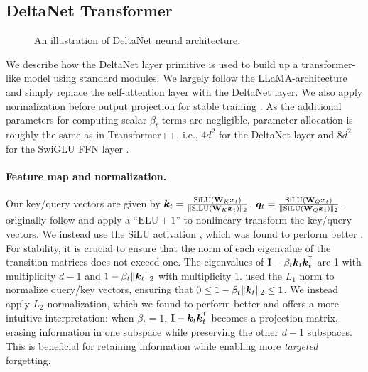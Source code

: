 \subsection{DeltaNet Transformer}
\begin{figure}
   \centering
   \vspace{-15mm}
   \resizebox{\linewidth}{!}{}
   \vspace{-8mm}
   \caption{An illustration of DeltaNet neural architecture.}
   \label{fig:enter-label}
   \vspace{-10mm}
\end{figure}

We describe how the DeltaNet layer primitive is used to build up a transformer-like model using standard modules. We largely  follow the LLaMA-architecture  \cite[Transformer++,][]{touvron2023llama} and simply replace the self-attention layer with the DeltaNet layer. We also apply normalization before output projection for stable training \cite{qin_devil_2022, Mercat2024LinearizingLL}. As the additional parameters for computing scalar $\beta_t$ terms are negligible,  parameter allocation is roughly the same as in Transformer++, i.e., $4d^2$ for the DeltaNet layer  and $8d^2$ for the SwiGLU FFN layer \cite{shazeer2020glu}. 
\vspace{-2mm}
\paragraph{Feature map and normalization.} 
Our key/query vectors are given by ${\bm{k}}_t = \frac{\text{SiLU}({\mathbf{W}}_{K}{\bm{x}}_t)}{\Vert \text{SiLU}({\mathbf{W}}_{K}{\bm{x}}_t)\Vert_2}$, ${\bm{q}}_t = \frac{\text{SiLU}({\mathbf{W}}_{Q}{\bm{x}}_t)}{\Vert \text{SiLU}({\mathbf{W}}_{Q}{\bm{x}}_t)\Vert_2}$.  \citet{schlag_linear_2021} originally follow \citet{katharopoulos_transformers_2020} and apply a ``$\text{ELU}+1$'' \cite{clevert_fast_2016} to nonlineary transform the key/query vectors. We instead use the $\text{SiLU}$ activation \cite{elfwing_sigmoid-weighted_2017}, which was found to perform better \cite{qin2023scaling, mamba2}.
For stability, it is crucial to ensure that the norm of each eigenvalue of the transition matrices does not exceed one.  The eigenvalues of $\rmI - \beta_t \vk_t \vk_t^\intercal$ are 1 with multiplicity \(d-1\) and \(1 - \beta_t \|{\bm{k}}_t\|_2\) with multiplicity 1. \citet{schlag_linear_2021} used the $L_1$ norm to normalize query/key vectors, ensuring that $
0 \leq 1 - \beta_t \| {\bm{k}}_t\|_2 \leq 1$. We instead apply $L_2$ normalization, which we found to perform better and offers a more intuitive interpretation: when $\beta_t=1$, $\rmI-\vk_t \vk_t^\intercal$ becomes a projection matrix, erasing information in one subspace while preserving the other $d-1$ subspaces. This is beneficial for retaining information while enabling more \emph{targeted} forgetting. 


